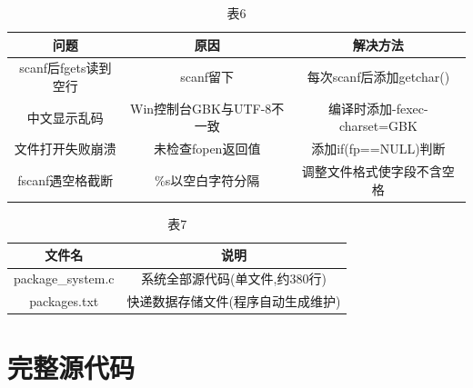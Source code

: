 \documentclass[withoutpreface,bwprint]{cumcmthesis}
\begin{document}
\begin{table}[H]
  \centering
  \caption{表6}
  \label{tab:6}
  \begin{tabular}{|c|c|c|}
    \hline
    问题 & 原因 & 解决方法 \\ \hline
    scanf后fgets读到空行 & scanf留下\n & 每次scanf后添加getchar() \\ \hline
    中文显示乱码 & Win控制台GBK与UTF-8不一致 & 编译时添加-fexec-charset=GBK \\ \hline
    文件打开失败崩溃 & 未检查fopen返回值 & 添加if(fp==NULL)判断 \\ \hline
    fscanf遇空格截断 & \%s以空白字符分隔 & 调整文件格式使字段不含空格 \\ \hline
  \end{tabular}
\end{table}

\begin{table}[H]
  \centering
  \caption{表7}
  \label{tab:7}
  \begin{tabular}{|c|c|}
    \hline
    文件名 & 说明 \\ \hline
    package\_system.c & 系统全部源代码(单文件,约380行) \\ \hline
    packages.txt & 快递数据存储文件(程序自动生成维护) \\ \hline
  \end{tabular}
\end{table}

\section{完整源代码}

\end{document}
